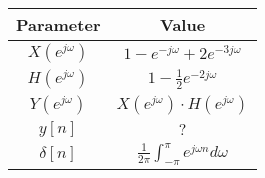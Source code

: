 
    \begin{tabular}{|c|c|}
       \hline
        \textbf{Parameter} & \textbf{Value}\\
        \hline
        $X(e^{j\omega})$ & $1 - e^{-j\omega} + 2e^{-3j\omega}$ \\
        \hline
        $H(e^{j\omega})$ & $1 - \frac{1}{2} e^{-2j\omega}$ \\
        \hline
        $Y(e^{j\omega})$ & $X(e^{j\omega}) \cdot H(e^{j\omega})$\\
        \hline
        $y[n]$           & $?$\\
        \hline
        $\delta[n]$  & $\frac{1}{2\pi}\int_{-\pi}^{\pi} e^{j\omega n} d\omega$\\
        \hline
    \end{tabular}
    
